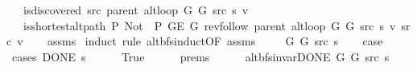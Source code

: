 \begin{isabellebody}
\ \ \ {\isachardoublequoteopen}is{\isacharunderscore}{\kern0pt}discovered\ src\ {\isacharparenleft}{\kern0pt}parent\ {\isacharparenleft}{\kern0pt}alt{\isacharunderscore}{\kern0pt}loop\ G{}\ G{}\ src\ s{\isacharparenright}{\kern0pt}{\isacharparenright}{\kern0pt}\ v{\isachardoublequoteclose}\isanewline
\ \ \ {\isachardoublequoteopen}is{\isacharunderscore}{\kern0pt}shortest{\isacharunderscore}{\kern0pt}alt{\isacharunderscore}{\kern0pt}path\ P{\isacharprime}{\kern0pt}{\isacharprime}{\kern0pt}\ {\isacharparenleft}{\kern0pt}Not\ {\isasymcirc}\ P{\isacharprime}{\kern0pt}{\isacharprime}{\kern0pt}{\isacharparenright}{\kern0pt}\ {\isacharparenleft}{\kern0pt}G{\isachardot}{\kern0pt}E\ G{\isacharparenright}{\kern0pt}\ {\isacharparenleft}{\kern0pt}rev{\isacharunderscore}{\kern0pt}follow\ {\isacharparenleft}{\kern0pt}parent\ {\isacharparenleft}{\kern0pt}alt{\isacharunderscore}{\kern0pt}loop\ G{}\ G{}\ src\ s{\isacharparenright}{\kern0pt}{\isacharparenright}{\kern0pt}\ v{\isacharparenright}{\kern0pt}\ src\ v{\isachardoublequoteclose}\isanewline
%
\isadelimproof
\ \ %
\endisadelimproof
%
\isatagproof
{}\isamarkupfalse%
\ assms\isanewline
{}\isamarkupfalse%
\ {\isacharparenleft}{\kern0pt}induct\ rule{\isacharcolon}{\kern0pt}\ alt{\isacharunderscore}{\kern0pt}bfs{\isacharunderscore}{\kern0pt}induct{\isacharbrackleft}{\kern0pt}OF\ assms{\isacharparenleft}{\kern0pt}{}{\isacharparenright}{\kern0pt}{\isacharbrackright}{\kern0pt}{\isacharparenright}{\kern0pt}\isanewline
\ \ \isamarkupfalse%
\ {\isacharparenleft}{\kern0pt}{}\ G{}\ G{}\ src\ s{\isacharparenright}{\kern0pt}\isanewline
\ \ \isamarkupfalse%
\ {\isacharquery}{\kern0pt}case\isanewline
\ \ \isamarkupfalse%
\ {\isacharparenleft}{\kern0pt}cases\ {\isachardoublequoteopen}DONE\ s{\isachardoublequoteclose}{\isacharparenright}{\kern0pt}\isanewline
\ \ \ \ \isamarkupfalse%
\ True\isanewline
\ \ \ \ \isamarkupfalse%
\ {\isachardoublequoteopen}{}{\isachardot}{\kern0pt}prems{\isachardoublequoteclose}{\isacharparenleft}{\kern0pt}{}{\isacharparenright}{\kern0pt}\isanewline
\ \ \ \ \isamarkupfalse%
\ {\isachardoublequoteopen}alt{\isacharunderscore}{\kern0pt}bfs{\isacharunderscore}{\kern0pt}invar{\isacharunderscore}{\kern0pt}DONE{\isacharprime}{\kern0pt}\ G{}\ G{}\ src\ s{\isachardoublequoteclose}\isanewline
\ \ \ \ \ \ \isamarkupfalse%

\end{isabellebody}

